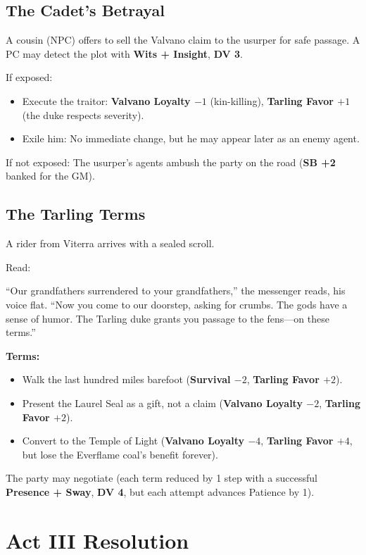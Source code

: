 \documentclass[11pt,a5paper]{book}
\newcommand{\sb}[1]{\textbf{SB #1}}
\newcommand{\dv}[1]{\textbf{DV #1}}
\begin{document}
\subsection*{The Cadet's Betrayal}

A cousin (NPC) offers to sell the Valvano claim to the usurper for safe passage. A PC may detect the plot with \textbf{Wits + Insight}, \dv{3}. 

If exposed:
\begin{itemize}[leftmargin=*]
\item Execute the traitor: \textbf{Valvano Loyalty $-1$} (kin-killing), \textbf{Tarling Favor $+1$} (the duke respects severity).
\item Exile him: No immediate change, but he may appear later as an enemy agent.
\end{itemize}

If not exposed: The usurper's agents ambush the party on the road (\sb{+2} banked for the GM).

\subsection*{The Tarling Terms}

A rider from Viterra arrives with a sealed scroll.

Read:
\begin{quoting}
``Our grandfathers surrendered to your grandfathers,'' the messenger reads, his voice flat. ``Now you come to our doorstep, asking for crumbs. The gods have a sense of humor. The Tarling duke grants you passage to the fens---on these terms.''
\end{quoting}

\textbf{Terms:}
\begin{itemize}[leftmargin=*]
\item Walk the last hundred miles barefoot (\textbf{Survival $-2$}, \textbf{Tarling Favor $+2$}).
\item Present the Laurel Seal as a gift, not a claim (\textbf{Valvano Loyalty $-2$}, \textbf{Tarling Favor $+2$}).
\item Convert to the Temple of Light (\textbf{Valvano Loyalty $-4$}, \textbf{Tarling Favor $+4$}, but lose the Everflame coal's benefit forever).
\end{itemize}

The party may negotiate (each term reduced by 1 step with a successful \textbf{Presence + Sway}, \dv{4}, but each attempt advances Patience by 1).

\section*{Act III Resolution}
\end{document}
